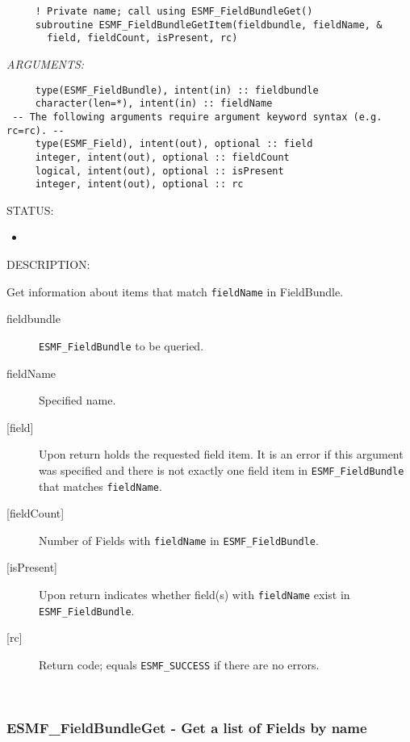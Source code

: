   
\begin{verbatim}     ! Private name; call using ESMF_FieldBundleGet()
     subroutine ESMF_FieldBundleGetItem(fieldbundle, fieldName, &
       field, fieldCount, isPresent, rc)\end{verbatim}{\em ARGUMENTS:}
\begin{verbatim}     type(ESMF_FieldBundle), intent(in) :: fieldbundle
     character(len=*), intent(in) :: fieldName
 -- The following arguments require argument keyword syntax (e.g. rc=rc). --
     type(ESMF_Field), intent(out), optional :: field
     integer, intent(out), optional :: fieldCount
     logical, intent(out), optional :: isPresent
     integer, intent(out), optional :: rc\end{verbatim}
{\sf STATUS:}
   \begin{itemize}
   \item{}
   \end{itemize}
  
{\sf DESCRIPTION:\\ }


   Get information about items that match {\tt fieldName} in FieldBundle.
  
   \begin{description}
   \item [fieldbundle]
   {\tt ESMF\_FieldBundle} to be queried.
   \item [fieldName]
   Specified name.
   \item [{[field]}]
   Upon return holds the requested field item. It is an error if this
   argument was specified and there is not exactly one field item in
   {\tt ESMF\_FieldBundle} that matches {\tt fieldName}.
   \item [{[fieldCount]}]
   Number of Fields with {\tt fieldName} in {\tt ESMF\_FieldBundle}.
   \item [{[isPresent]}]
   Upon return indicates whether field(s) with {\tt fieldName} exist
   in {\tt ESMF\_FieldBundle}.
   \item [{[rc]}]
   Return code; equals {\tt ESMF\_SUCCESS} if there are no errors.
   \end{description}
   
 
\mbox{}\hrulefill\ 
 
\subsubsection [ESMF\_FieldBundleGet] {ESMF\_FieldBundleGet - Get a list of Fields by name}


